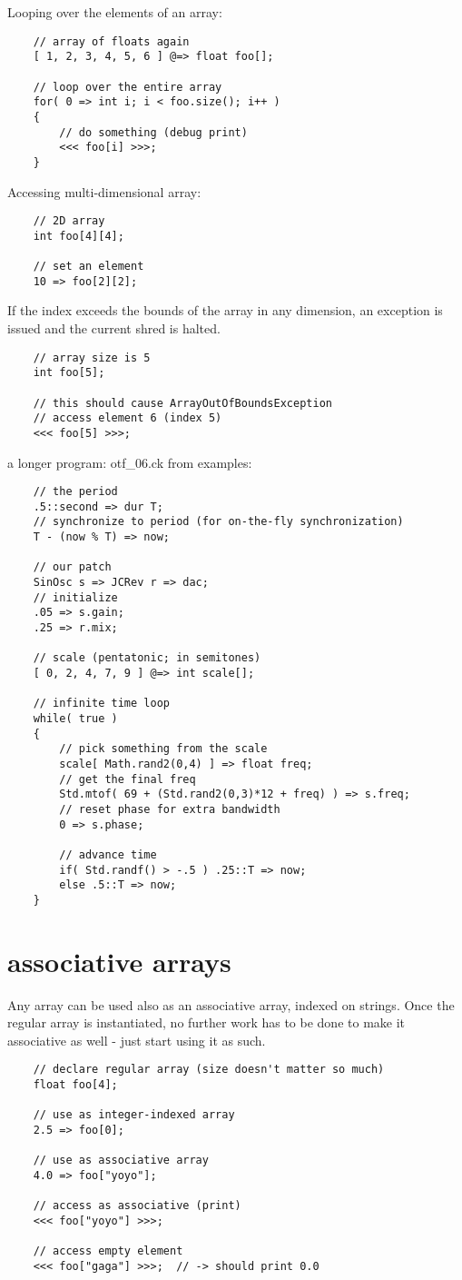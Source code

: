 Looping over the elements of an array:
\begin{verbatim}
    // array of floats again
    [ 1, 2, 3, 4, 5, 6 ] @=> float foo[];

    // loop over the entire array
    for( 0 => int i; i < foo.size(); i++ )
    {
        // do something (debug print)
        <<< foo[i] >>>;
    }
\end{verbatim}

Accessing multi-dimensional array:
\begin{verbatim}
    // 2D array
    int foo[4][4];

    // set an element
    10 => foo[2][2];
\end{verbatim}

If the index exceeds the bounds of the array in any dimension, an exception is issued and the current shred is halted.
\begin{verbatim}
    // array size is 5
    int foo[5];

    // this should cause ArrayOutOfBoundsException
    // access element 6 (index 5)
    <<< foo[5] >>>;
\end{verbatim}

a longer program: otf\_06.ck from examples:
\begin{verbatim}
    // the period
    .5::second => dur T;
    // synchronize to period (for on-the-fly synchronization)
    T - (now % T) => now;

    // our patch
    SinOsc s => JCRev r => dac;
    // initialize
    .05 => s.gain;
    .25 => r.mix;

    // scale (pentatonic; in semitones)
    [ 0, 2, 4, 7, 9 ] @=> int scale[];

    // infinite time loop
    while( true )
    {
        // pick something from the scale
        scale[ Math.rand2(0,4) ] => float freq;
        // get the final freq
        Std.mtof( 69 + (Std.rand2(0,3)*12 + freq) ) => s.freq;
        // reset phase for extra bandwidth
        0 => s.phase;

        // advance time
        if( Std.randf() > -.5 ) .25::T => now;
        else .5::T => now;
    }
\end{verbatim}


\section{associative arrays}

Any array can be used also as an associative array, indexed on strings. Once the regular array is instantiated, no further work has to be done to make it associative as well - just start using it as such.
\begin{verbatim}
    // declare regular array (size doesn't matter so much)
    float foo[4];

    // use as integer-indexed array
    2.5 => foo[0];

    // use as associative array
    4.0 => foo["yoyo"];

    // access as associative (print)
    <<< foo["yoyo"] >>>;

    // access empty element
    <<< foo["gaga"] >>>;  // -> should print 0.0
\end{verbatim}

